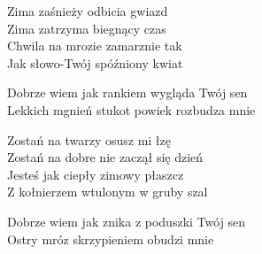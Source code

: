 \begin{text}
    Zima zaśnieży odbicia gwiazd\\
    Zima zatrzyma biegnący czas\\
    Chwila na mrozie zamarznie tak\\
    Jak słowo-Twój spóźniony kwiat

    Dobrze wiem jak rankiem wygląda Twój sen\\
    Lekkich mgnień stukot powiek rozbudza mnie

    Zostań na twarzy osusz mi łzę\\
    Zostań na dobre nie zaczął się dzień\\
    Jesteś jak ciepły zimowy płaszcz\\
    Z kołnierzem wtulonym w gruby szal

    Dobrze wiem jak znika z poduszki Twój sen\\
    Ostry mróz skrzypieniem obudzi mnie
\end{text}
\begin{chord}

\end{chord}